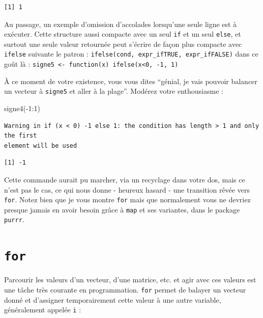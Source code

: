 \documentclass[
  letterpaper,
  DIV=11,
  numbers=noendperiod]{scrreprt}
\newenvironment{Shaded}{\begin{snugshade}}{\end{snugshade}}
\newcommand{\DecValTok}[1]{\textcolor[rgb]{0.68,0.00,0.00}{#1}}
\newcommand{\FunctionTok}[1]{\textcolor[rgb]{0.28,0.35,0.67}{#1}}
\newcommand{\NormalTok}[1]{\textcolor[rgb]{0.00,0.23,0.31}{#1}}
\newcommand{\SpecialCharTok}[1]{\textcolor[rgb]{0.37,0.37,0.37}{#1}}
\begin{document}
\begin{verbatim}
[1] 1
\end{verbatim}

Au passage, un exemple d'omission d'accolades lorsqu'une seule ligne est
à exécuter. Cette structure aussi compacte avec un seul \texttt{if} et
un seul \texttt{else}, et surtout une seule valeur retournée peut
s'écrire de façon plus compacte avec \texttt{ifelse} suivante le patron
: \texttt{ifelse(cond,\ expr\_ifTRUE,\ expr\_ifFALSE)} dans ce goût là :
\texttt{signe5\ \textless{}-\ function(x)\ ifelse(x\textless{}0,\ -1,\ 1)}

À ce moment de votre existence, vous vous dites ``génial, je vais
pouvoir balancer un vecteur à \texttt{signe5} et aller à la plage''.
Modérez votre enthousiasme :

\begin{Shaded}
\begin{Highlighting}[]
\FunctionTok{signe4}\NormalTok{(}\SpecialCharTok{{-}}\DecValTok{1}\SpecialCharTok{:}\DecValTok{1}\NormalTok{)}
\end{Highlighting}
\end{Shaded}

\begin{verbatim}
Warning in if (x < 0) -1 else 1: the condition has length > 1 and only the first
element will be used
\end{verbatim}

\begin{verbatim}
[1] -1
\end{verbatim}

Cette commande aurait pu marcher, via un recyclage dans votre dos, mais
ce n'est pas le cas, ce qui nous donne - heureux hasard - une transition
rêvée vers \texttt{for}. Notez bien que je vous montre \texttt{for} mais
que normalement vous ne devriez presque jamais en avoir besoin grâce à
\texttt{map} et ses variantes, dans le package \texttt{purrr}.

\hypertarget{for}{%
\section{\texorpdfstring{\texttt{for}}{for}}\label{for}}

Parcourir les valeurs d'un vecteur, d'une matrice, etc. et agir avec ces
valeurs est une tâche très courante en programmation. \texttt{for}
permet de balayer un vecteur donné et d'assigner temporairement cette
valeur à une autre variable, généralement appelée \texttt{i} :
\end{document}
